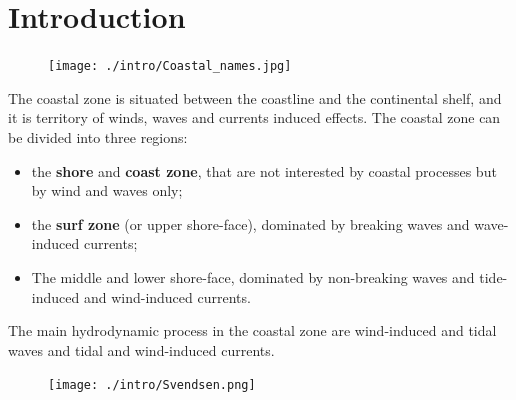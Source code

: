 \chapter{Introduction}
\begin{figure}[h]
\centering
\texttt{[image: ./intro/Coastal\_names.jpg]}
\end{figure}
The coastal zone is situated between the coastline and the continental shelf, and it is territory of winds, waves and currents induced effects. The coastal zone can be divided into three regions:
\begin{itemize}
\item the \textbf{shore} and \textbf{coast zone}, that are not interested by coastal processes but by wind and waves only;
\item the \textbf{surf zone} (or upper shore-face), dominated by breaking waves and wave-induced currents;
\item The middle and lower shore-face, dominated by non-breaking waves and tide-induced and wind-induced currents.
\end{itemize}
The main hydrodynamic process in the coastal zone are wind-induced and tidal waves and tidal and wind-induced currents. 
\begin{figure}[htp]
\centering
\texttt{[image: ./intro/Svendsen.png]}
\end{figure}
